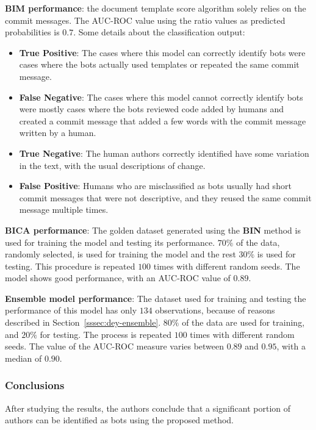 \documentclass[a4paper, 12pt]{book}
\begin{document}
\textbf{BIM performance}: the document template score algorithm solely relies on the commit messages. The AUC-ROC value using the ratio values as predicted probabilities is $0.7$. Some details about the classification output:
\begin{itemize}
	\item \textbf{True Positive}: The cases where this model can correctly identify
bots were cases where the bots actually used templates or repeated the same commit message. 
    \item \textbf{False Negative}: The cases where this model cannot correctly identify bots were mostly cases where the bots reviewed code added by humans and created a commit message that added a few words with the commit message written by a human.
    \item \textbf{True Negative}: The human authors correctly identified have some variation in the text, with the usual descriptions of change.
    \item \textbf{False Positive}: Humans who are misclassified as bots usually had short commit messages that were not descriptive, and they reused the same commit message multiple times.
\end{itemize}

\textbf{BICA performance}: The golden dataset generated using the \textbf{BIN} method is used for training the model and testing its performance. $70\%$ of the data, randomly selected, is used for training the model and the rest $30\%$ is used for testing. This procedure is repeated $100$ times with different random seeds. The model shows good performance, with an AUC-ROC value of $0.89$.

\textbf{Ensemble model performance}: The dataset used for training and testing the performance of this model has only $134$ observations, because of reasons described in Section~\ref{sssec:dey-ensemble}. $80\%$ of the data are used for training, and $20\%$ for testing. The process is repeated $100$ times with different random seeds. The value of the AUC-ROC measure varies between $0.89$ and $0.95$, with a median of $0.90$.

\subsubsection{Conclusions}
\label{sssec:dey-conclusions}

After studying the results, the authors conclude that a significant portion of authors can be identified as bots using the proposed method.
\end{document}
